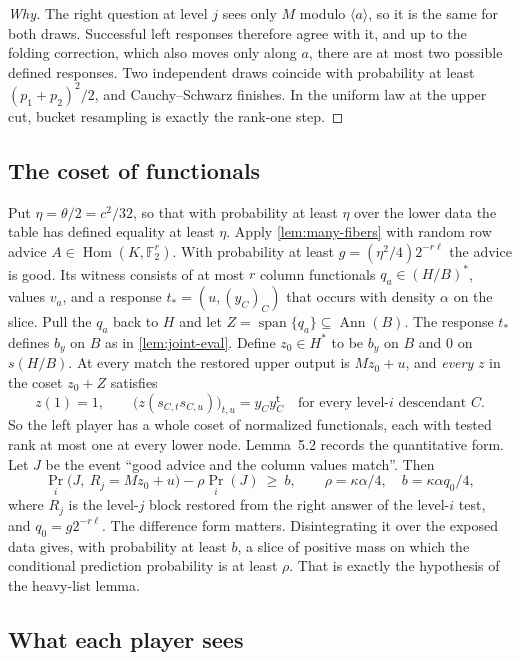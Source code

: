 \documentclass[11pt]{article}
\theoremstyle{definition}
\theoremstyle{remark}
\DeclareMathOperator{\Hom}{Hom}
\DeclareMathOperator{\Span}{span}
\DeclareMathOperator{\Ann}{Ann}
\newcommand{\Fb}{\mathbb F_2}
\begin{document}
\begin{proof}[Why]
The right question at level $j$ sees only $M$ modulo $\langle a\rangle$, so it
is the same for both draws. Successful left responses therefore agree with it,
and up to the folding correction, which also moves only along $a$, there are
at most two possible defined responses. Two independent draws coincide with
probability at least $(p_1+p_2)^2/2$, and Cauchy--Schwarz finishes. In the
uniform law at the upper cut, bucket resampling is exactly the rank-one step.
\end{proof}

\subsection{The coset of functionals}

Put $\eta=\theta/2=c^2/32$, so that with probability at least $\eta$ over the
lower data the table has defined equality at least $\eta$. Apply
\cref{lem:many-fibers} with random row advice $A\in\Hom(K,\Fb^r)$. With
probability at least $g=(\eta^2/4)2^{-r\ell}$ the advice is good. Its witness consists
of at most $r$ column functionals $q_a\in(H/B)^*$, values $v_a$, and a
response $t_*=(u,(y_C)_C)$ that occurs with density $\alpha$ on the slice.
Pull the $q_a$ back to $H$ and let $Z=\Span\{q_a\}\subseteq\Ann(B)$. The
response $t_*$ defines $b_y$ on $B$ as in \cref{lem:joint-eval}. Define
$z_0\in H^*$ to be $b_y$ on $B$ and $0$ on $s(H/B)$. At every match the
restored upper output is $Mz_0+u$, and \emph{every} $z$ in the coset $z_0+Z$
satisfies
\[
 z(1)=1,\qquad\bigl(z(s_{C,t}s_{C,u})\bigr)_{t,u}=y_Cy_C^{\mathsf t}
 \quad\text{for every level-$i$ descendant }C.
\]
So the left player has a whole coset of normalized functionals, each with
tested rank at most one at every lower node. Lemma~5.2 records the
quantitative form. Let $J$ be the event ``good advice and the column values
match''. Then
\[
 \Pr_i\bigl(J,\ R_j=Mz_0+u\bigr)-\rho\Pr_i(J)\ \ge\ b,
 \qquad \rho=\kappa\alpha/4,\quad b=\kappa\alpha q_0/4,
\]
where $R_j$ is the level-$j$ block restored from the right answer of the
level-$i$ test, and $q_0=g2^{-r\ell}$.
The difference form matters. Disintegrating it over the exposed data gives,
with probability at least $b$, a slice of positive mass on which the
conditional prediction probability is at least $\rho$. That is exactly the
hypothesis of the heavy-list lemma.

\subsection{What each player sees}
\end{document}
